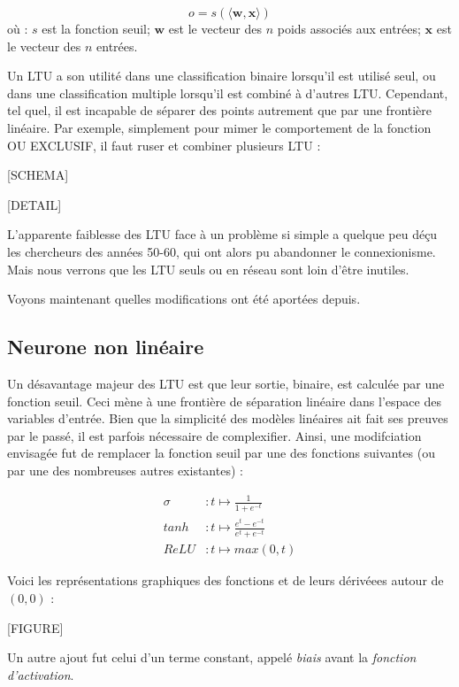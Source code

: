 \[o = s(\langle \boldsymbol{w}, \boldsymbol{x} \rangle)\]
où : \(s\) est la fonction seuil; \(\boldsymbol{w}\) est le vecteur des \(n\) poids associés aux entrées; \(\boldsymbol{x}\) est le vecteur des \(n\) entrées.

Un LTU a son utilité dans une classification binaire lorsqu'il est utilisé seul, ou dans une classification multiple lorsqu'il est combiné à d'autres LTU. Cependant, tel quel, il est incapable de séparer des points autrement que par une frontière linéaire. Par exemple, simplement pour mimer le comportement de la fonction OU EXCLUSIF, il faut ruser et combiner plusieurs LTU : 

[SCHEMA]

[DETAIL]

L'apparente faiblesse des LTU face à un problème si simple a quelque peu déçu les chercheurs des années 50-60, qui ont alors pu abandonner le connexionisme. Mais nous verrons que les LTU seuls ou en réseau sont loin d'être inutiles. 

Voyons maintenant quelles modifications ont été aportées depuis.

\subsection{Neurone non linéaire}
Un désavantage majeur des LTU est que leur sortie, binaire, est calculée par une fonction seuil. Ceci mène à une frontière de séparation linéaire dans l'espace des variables d'entrée. Bien que la simplicité des modèles linéaires ait fait ses preuves par le passé, il est parfois nécessaire de complexifier. Ainsi, une modifciation envisagée fut de remplacer la fonction seuil par une des fonctions suivantes (ou par une des nombreuses autres existantes) : 

\begin{align}
\sigma &: t \mapsto \frac{1}{1 + e^{-t}}\\
tanh &: t \mapsto \frac{e^t - e^{-t}}{e^t + e^{-t}}\\
\mathit{ReLU} &: t \mapsto max(0, t)
\end{align}

Voici les représentations graphiques des fonctions et de leurs dérivéees autour de \((0, 0)\) : 

[FIGURE]

Un autre ajout fut celui d'un terme constant, appelé \emph{biais}%
avant la \emph{fonction d'activation}.

